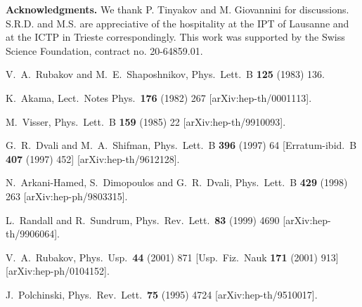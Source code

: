 \documentclass[a4paper,12pt]{article}
\begin{document}

{\bf Acknowledgments.}  We thank P. Tinyakov and M.
Giovannini for discussions. S.R.D. and M.S. are appreciative of the
hospitality at the IPT of Lausanne and at the ICTP in Trieste
correspondingly. This work was supported by the Swiss Science
Foundation, contract no. 20-64859.01. 

\begin{thebibliography}{99}

V.~A.~Rubakov and M.~E.~Shaposhnikov,
Phys.\ Lett.\ B {\bf 125} (1983) 136.

K.~Akama,
Lect.\ Notes Phys.\  {\bf 176} (1982) 267
[arXiv:hep-th/0001113].

M.~Visser,
Phys.\ Lett.\ B {\bf 159} (1985) 22
[arXiv:hep-th/9910093].

G.~R.~Dvali and M.~A.~Shifman,
Phys.\ Lett.\ B {\bf 396} (1997) 64
[Erratum-ibid.\ B {\bf 407} (1997) 452]
[arXiv:hep-th/9612128].

N.~Arkani-Hamed, S.~Dimopoulos and G.~R.~Dvali,
Phys.\ Lett.\ B {\bf 429} (1998) 263
[arXiv:hep-ph/9803315].

L.~Randall and R.~Sundrum,
Phys.\ Rev.\ Lett.\  {\bf 83} (1999) 4690
[arXiv:hep-th/9906064].

V.~A.~Rubakov,
Phys.\ Usp.\  {\bf 44} (2001) 871
[Usp.\ Fiz.\ Nauk {\bf 171} (2001) 913]
[arXiv:hep-ph/0104152].

J.~Polchinski,
Phys.\ Rev.\ Lett.\  {\bf 75} (1995) 4724
[arXiv:hep-th/9510017].


\end{thebibliography}
\end{document}
